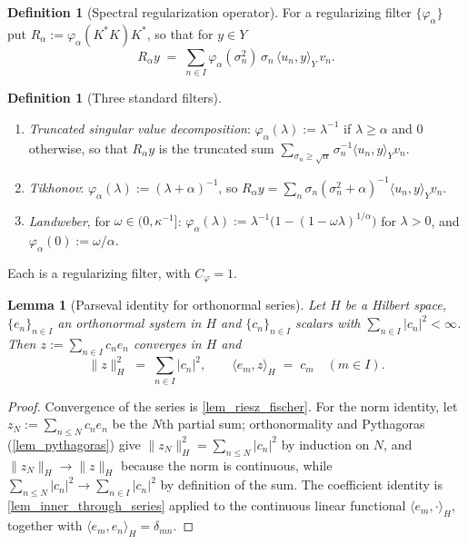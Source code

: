 \documentclass[a4paper]{report}
\theoremstyle{plain}
\newtheorem{lemma}[theorem]{Lemma}
\theoremstyle{definition}
\newtheorem{definition}[theorem]{Definition}
\theoremstyle{remark}
\begin{document}
\begin{definition}[Spectral regularization operator]
  \label{def_spectral_reg}
  For a regularizing filter $\{\varphi_{\alpha}\}$ put $R_{\alpha} :=
  \varphi_{\alpha}(K^{*}K)K^{*}$, so that for $y \in Y$
  \[
    R_{\alpha} y \;=\; \sum_{n \in I} \varphi_{\alpha}(\sigma_n^{2})\,\sigma_n\,
      \langle u_n, y\rangle_Y\, v_n .
  \]
\end{definition}


\begin{definition}[Three standard filters]
  \label{def_standard_filters}
  \begin{enumerate}
    \item \emph{Truncated singular value decomposition}:
      $\varphi_{\alpha}(\lambda) := \lambda^{-1}$ if $\lambda \ge \alpha$ and $0$
      otherwise, so that $R_{\alpha}y$ is the truncated sum
      $\sum_{\sigma_n \ge \sqrt{\alpha}} \sigma_n^{-1}\langle u_n, y\rangle_Y v_n$.
    \item \emph{Tikhonov}: $\varphi_{\alpha}(\lambda) := (\lambda + \alpha)^{-1}$, so
      $R_{\alpha}y = \sum_{n} \sigma_n(\sigma_n^{2}+\alpha)^{-1}\langle u_n,y\rangle_Y
      v_n$.
    \item \emph{Landweber}, for $\omega \in (0,\kappa^{-1}]$:
      $\varphi_{\alpha}(\lambda) := \lambda^{-1}\bigl(1 - (1-\omega\lambda)^{1/\alpha}
      \bigr)$ for $\lambda > 0$, and $\varphi_{\alpha}(0) := \omega/\alpha$.
  \end{enumerate}
  Each is a regularizing filter, with $C_{\varphi} = 1$.
\end{definition}


\begin{lemma}[Parseval identity for orthonormal series]
  \label{lem_parseval_series}
  Let $H$ be a Hilbert space, $\{e_n\}_{n \in I}$ an orthonormal system in $H$ and
  $\{c_n\}_{n \in I}$ scalars with $\sum_{n \in I}|c_n|^{2} < \infty$.  Then
  $z := \sum_{n \in I} c_ne_n$ converges in $H$ and
  \[
    \|z\|_H^{2} \;=\; \sum_{n \in I}|c_n|^{2},
    \qquad
    \langle e_m, z\rangle_H \;=\; c_m \quad (m \in I) .
  \]
\end{lemma}

\begin{proof}
  Convergence of the series is \cref{lem_riesz_fischer}.  For the norm identity, let
  $z_N := \sum_{n \le N}c_ne_n$ be the $N$th partial sum; orthonormality and Pythagoras
  (\cref{lem_pythagoras}) give $\|z_N\|_H^{2} = \sum_{n \le N}|c_n|^{2}$ by induction on
  $N$, and $\|z_N\|_H \to \|z\|_H$ because the norm is continuous, while
  $\sum_{n \le N}|c_n|^{2} \to \sum_{n \in I}|c_n|^{2}$ by definition of the sum.  The
  coefficient identity is \cref{lem_inner_through_series} applied to the continuous
  linear functional $\langle e_m, \cdot\rangle_H$, together with
  $\langle e_m, e_n\rangle_H = \delta_{mn}$.
\end{proof}
\end{document}
